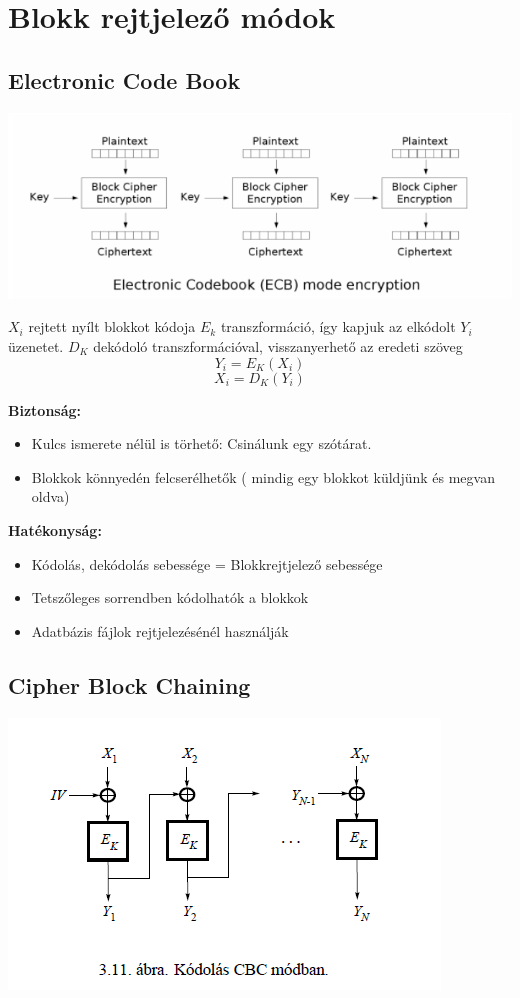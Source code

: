 \section{Blokk rejtjelező módok}

\subsection{Electronic Code Book}

	\begin{center}
		\includegraphics[scale=0.7]{img/ECB}
	\end{center}

	$X_i$ rejtett nyílt blokkot kódoja $E_k$ transzformáció, így kapjuk az elkódolt $Y_i$ üzenetet. $D_K$ dekódoló transzformációval, visszanyerhető az eredeti szöveg
	$$Y_i = E_K(X_i)$$
	$$X_i = D_K(Y_i)$$

\textbf{Biztonság:}
	\begin{itemize}
		\item Kulcs ismerete nélül is törhető: Csinálunk egy szótárat.
		\item Blokkok könnyedén felcserélhetők ( mindig egy blokkot küldjünk és megvan oldva)
	\end{itemize}

\textbf{Hatékonyság:}
	\begin{itemize}
		\item Kódolás, dekódolás sebessége = Blokkrejtjelező sebessége
		\item Tetszőleges sorrendben kódolhatók a blokkok
		\item Adatbázis fájlok rejtjelezésénél használják
	\end{itemize}

\subsection{Cipher Block Chaining}

	\begin{center}
		\includegraphics[scale=0.8]{img/CBC}
	\end{center}

